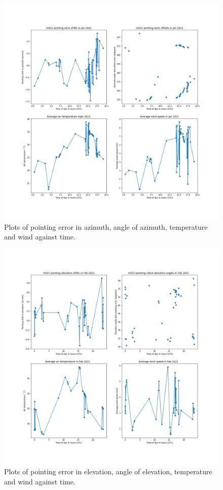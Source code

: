 \documentclass{article}
\begin{document}
\begin{figure}[H]
	\centering
	\includegraphics[scale=0.45]{m033_azim_Jan_mapped.png}
	
	\caption{Plots of pointing error in azimuth, angle of azimuth, temperature and wind against time.}
	\label{fig:m033AzimJanMapped}
\end{figure}

\begin{figure}[H]
	\centering
	\includegraphics[scale=0.45]{m033_elev_Feb_mapped.png}
	
	\caption{Plots of pointing error in elevation, angle of elevation, temperature and wind against time.}
	\label{fig:m033ElevFebMapped}
\end{figure}
\end{document}
